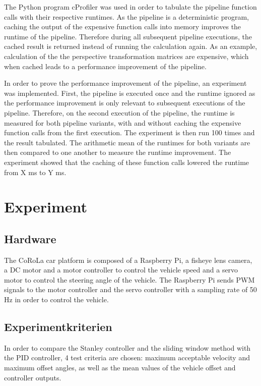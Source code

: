 \documentclass[arbeit=studie,oneside,BCOR=12mm]{ArbeitRST}
\begin{document}
The Python program cProfiler was used in order to tabulate the pipeline
function calls with their respective runtimes. As the pipeline is a
deterministic program, caching the output of the expensive function calls into
memory improves the runtime of the pipeline. Therefore during all subsequent
pipeline executions, the cached result is returned instead of running the
calculation again. As an example, calculation of the the perspective
transformation matrices are expensive, which when cached leads to a performance
improvement of the pipeline.

In order to prove the performance improvement of the pipeline, an experiment
was implemented. First, the pipeline is executed once and the runtime ignored
as the performance improvement is only relevant to subsequent executions of the
pipeline. Therefore, on the second execution of the pipeline, the runtime is
measured for both pipeline variants, with and without caching the expensive
function calls from the first execution. The experiment is then run 100 times
and the result tabulated. The arithmetic mean of the runtimes for both variants
are then compared to one another to measure the runtime improvement. The
experiment showed that the caching of these function calls lowered the runtime
from X ms to Y ms.

\chapter{Experiment}
\section{Hardware}

The CoRoLa car platform is composed of a Raspberry Pi, a fisheye lens camera, a
DC motor and a motor controller to control the vehicle speed and a servo motor
to control the steering angle of the vehicle. The Raspberry Pi sends PWM
signals to the motor controller and the servo controller with a sampling rate
of 50 Hz in order to control the vehicle. 

\section{Experimentkriterien}

In order to compare the Stanley controller and the sliding window method with
the PID controller, 4 test criteria are chosen: maximum acceptable velocity and
maximum offset angles, as well as the mean values of the vehicle
offset and controller outputs.
\end{document}
